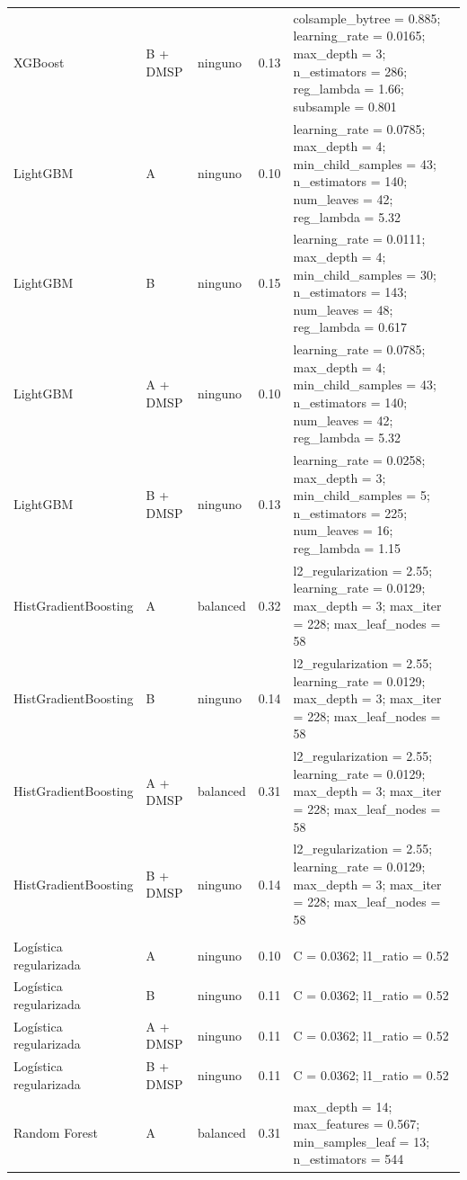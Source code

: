 \begin{longtable}{>{\raggedright\arraybackslash}p{}l l c>{\raggedright\arraybackslash}p{}}
  XGBoost & B + DMSP & ninguno & 0.13 & colsample\_bytree = 0.885; learning\_rate = 0.0165; max\_depth = 3; n\_estimators = 286; reg\_lambda = 1.66; subsample = 0.801 \\
  LightGBM & A & ninguno & 0.10 & learning\_rate = 0.0785; max\_depth = 4; min\_child\_samples = 43; n\_estimators = 140; num\_leaves = 42; reg\_lambda = 5.32 \\
  LightGBM & B & ninguno & 0.15 & learning\_rate = 0.0111; max\_depth = 4; min\_child\_samples = 30; n\_estimators = 143; num\_leaves = 48; reg\_lambda = 0.617 \\
  LightGBM & A + DMSP & ninguno & 0.10 & learning\_rate = 0.0785; max\_depth = 4; min\_child\_samples = 43; n\_estimators = 140; num\_leaves = 42; reg\_lambda = 5.32 \\
  LightGBM & B + DMSP & ninguno & 0.13 & learning\_rate = 0.0258; max\_depth = 3; min\_child\_samples = 5; n\_estimators = 225; num\_leaves = 16; reg\_lambda = 1.15 \\
  HistGradientBoosting & A & balanced & 0.32 & l2\_regularization = 2.55; learning\_rate = 0.0129; max\_depth = 3; max\_iter = 228; max\_leaf\_nodes = 58 \\
  HistGradientBoosting & B & ninguno & 0.14 & l2\_regularization = 2.55; learning\_rate = 0.0129; max\_depth = 3; max\_iter = 228; max\_leaf\_nodes = 58 \\
  HistGradientBoosting & A + DMSP & balanced & 0.31 & l2\_regularization = 2.55; learning\_rate = 0.0129; max\_depth = 3; max\_iter = 228; max\_leaf\_nodes = 58 \\
  HistGradientBoosting & B + DMSP & ninguno & 0.14 & l2\_regularization = 2.55; learning\_rate = 0.0129; max\_depth = 3; max\_iter = 228; max\_leaf\_nodes = 58 \\
  \midrule
  \multicolumn{5}{l}{\textbf{IPM, holdout temporal}} \\*
  Logística regularizada & A & ninguno & 0.10 & C = 0.0362; l1\_ratio = 0.52 \\
  Logística regularizada & B & ninguno & 0.11 & C = 0.0362; l1\_ratio = 0.52 \\
  Logística regularizada & A + DMSP & ninguno & 0.11 & C = 0.0362; l1\_ratio = 0.52 \\
  Logística regularizada & B + DMSP & ninguno & 0.11 & C = 0.0362; l1\_ratio = 0.52 \\
  Random Forest & A & balanced & 0.31 & max\_depth = 14; max\_features = 0.567; min\_samples\_leaf = 13; n\_estimators = 544 \\

\end{longtable}
